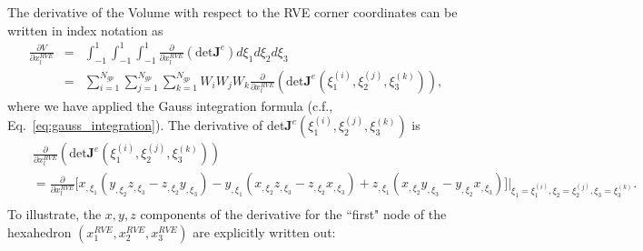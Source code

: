 The derivative of the Volume with respect to the RVE corner coordinates can be written in index notation as
%
\begin{eqnarray}
\frac{\partial V}{\partial x_l^{RVE}} &=& \int_{-1}^1 \int_{-1}^1 \int_{-1}^1 \frac{\partial}{\partial x_l^{RVE}} \left(\text{det}\pmb{J}^e\right) d\xi_1 d\xi_2 d\xi_3 \nonumber\\
%
&=& \sum_{i=1}^{N_{gp}} \sum_{j=1}^{N_{gp}} \sum_{k=1}^{N_{gp}} W_i W_j W_k \frac{\partial}{\partial x_l^{RVE}} \left(\text{det}\pmb{J}^e(\xi_1^{(i)},\xi_2^{(j)},\xi_3^{(k)})\right),
\label{eq:dVdvl}
\end{eqnarray}
%
where we have applied the Gauss integration formula (c.f., Eq.\ \eqref{eq:gauss_integration}). The derivative of det$\pmb{J}^e(\xi_1^{(i)},\xi_2^{(j)},\xi_3^{(k)})$ is 
%
\begin{eqnarray}
&&\frac{\partial}{\partial x_l^{RVE}}\left(\text{det}\pmb{J}^e(\xi_1^{(i)},\xi_2^{(j)},\xi_3^{(k)})\right) \nonumber\\
%
&&= \frac{\partial}{\partial x_l^{RVE}}\bigg[x_{,\xi_1}\left(y_{,\xi_2}z_{,\xi_3} - z_{,\xi_2}y_{,\xi_3} \right) - y_{,\xi_1}\left(x_{,\xi_2}z_{,\xi_3}-z_{,\xi_2}x_{,\xi_3} \right) + z_{,\xi_1}\left(x_{,\xi_2}y_{,\xi_3}-y_{,\xi_2}x_{,\xi_3} \right)\bigg] \bigg |_{\xi_1 = \xi_1^{(i)}, \xi_2 = \xi_2^{(j)}, \xi_3 = \xi_3^{(k)}}.  \nonumber\\
\end{eqnarray}
%
To illustrate, the $x, y, z$ components of the derivative for the ``first" node of the hexahedron $(x_1^{RVE},x_2^{RVE}, x_3^{RVE})$ are explicitly written out:
%

